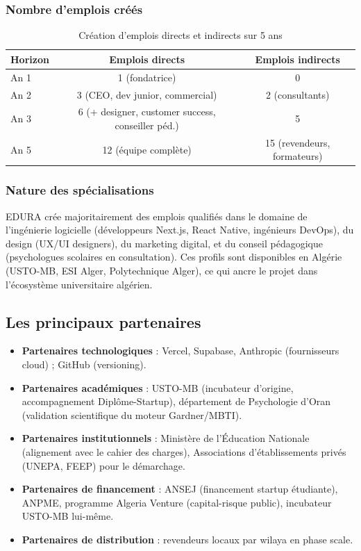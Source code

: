 \documentclass[12pt,a4paper,oneside]{report}
\begin{document}
\subsubsection{Nombre d'emplois créés}

\begin{table}[H]
\centering
\caption{Création d'emplois directs et indirects sur 5 ans}
\label{tab:emplois}
\begin{tabular}{lcc}
\toprule
\textbf{Horizon} & \textbf{Emplois directs} & \textbf{Emplois indirects} \\
\midrule
An 1 & 1 (fondatrice) & 0 \\
An 2 & 3 (CEO, dev junior, commercial) & 2 (consultants) \\
An 3 & 6 (+ designer, customer success, conseiller péd.) & 5 \\
An 5 & 12 (équipe complète) & 15 (revendeurs, formateurs) \\
\bottomrule
\end{tabular}
\end{table}

\subsubsection{Nature des spécialisations}

EDURA crée majoritairement des emplois qualifiés dans le domaine de l'ingénierie logicielle (développeurs Next.js, React Native, ingénieurs DevOps), du design (UX/UI designers), du marketing digital, et du conseil pédagogique (psychologues scolaires en consultation). Ces profils sont disponibles en Algérie (USTO-MB, ESI Alger, Polytechnique Alger), ce qui ancre le projet dans l'écosystème universitaire algérien.

\subsection{Les principaux partenaires}

\begin{itemize}
  \item \textbf{Partenaires technologiques} : Vercel, Supabase, Anthropic (fournisseurs cloud) ; GitHub (versioning).
  \item \textbf{Partenaires académiques} : USTO-MB (incubateur d'origine, accompagnement Diplôme-Startup), département de Psychologie d'Oran (validation scientifique du moteur Gardner/MBTI).
  \item \textbf{Partenaires institutionnels} : Ministère de l'Éducation Nationale (alignement avec le cahier des charges), Associations d'établissements privés (UNEPA, FEEP) pour le démarchage.
  \item \textbf{Partenaires de financement} : ANSEJ (financement startup étudiante), ANPME, programme Algeria Venture (capital-risque public), incubateur USTO-MB lui-même.
  \item \textbf{Partenaires de distribution} : revendeurs locaux par wilaya en phase scale.
\end{itemize}
\end{document}
